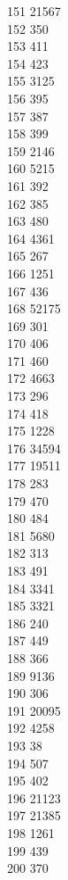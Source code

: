 { 151	21567 \\
 152	350 \\
 153	411 \\
 154	423 \\
 155	3125 \\
 156	395 \\
 157	387 \\
 158	399 \\
 159	2146 \\
 160	5215 \\
 161	392 \\
 162	385 \\
 163	480 \\
 164	4361 \\
 165	267 \\
 166	1251 \\
 167	436 \\
 168	52175 \\
 169	301 \\
 170	406 \\
 171	460 \\
 172	4663 \\
 173	296 \\
 174	418 \\
 175	1228 \\
 176	34594 \\
 177	19511 \\
 178	283 \\
 179	470 \\
 180	484 \\
 181	5680 \\
 182	313 \\
 183	491 \\
 184	3341 \\
 185	3321 \\
 186	240 \\
 187	449 \\
 188	366 \\
 189	9136 \\
 190	306 \\
 191	20095 \\
 192	4258 \\
 193	38 \\
 194	507 \\
 195	402 \\
 196	21123 \\
 197	21385 \\
 198	1261 \\
 199	439 \\
 200	370 \\
}
